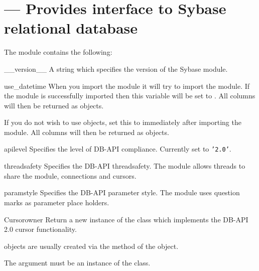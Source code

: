 \section{ --- Provides interface to Sybase relational database}



The  module contains the following:

\begin{datadesc}{__version__}
A string which specifies the version of the Sybase module.
\end{datadesc}

\begin{datadesc}{use_datetime}
When you import the  module it will try to import the
 module.  If the  module is
successfully imported then this variable will be set to .  All
 columns will then be returned as
 objects.

If you do not wish to use  objects, set
this to  immediately after importing the 
module.  All  columns will then be returned as
 objects.
\end{datadesc}

\begin{datadesc}{apilevel}
Specifies the level of DB-API compliance.  Currently set to
\texttt{'2.0'}.
\end{datadesc}

\begin{datadesc}{threadsafety}
Specifies the DB-API threadsafety.  The  module allows
threads to share the module, connections and cursors.
\end{datadesc}

\begin{datadesc}{paramstyle}
Specifies the DB-API parameter style.  The  module uses
question marks as parameter place holders.
\end{datadesc}

\begin{classdesc}{Cursor}{owner}
Return a new instance of the  class which implements the
DB-API 2.0 cursor functionality.

 objects are usually created via the
 method of the  object.

The  argument must be an instance of the 
class.
\end{classdesc}

